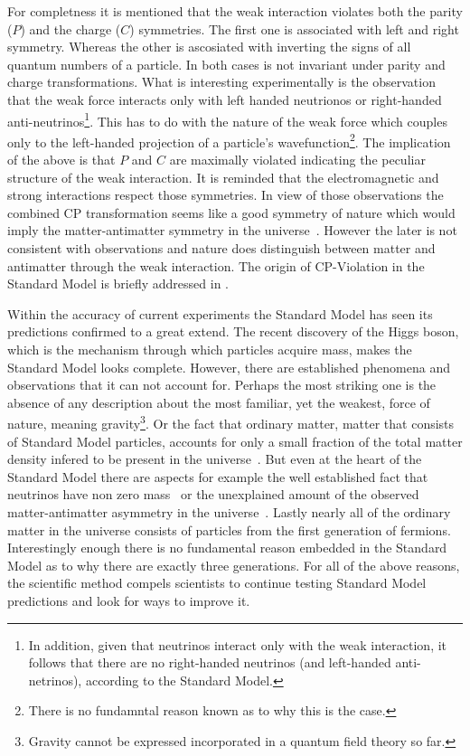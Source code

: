 For completness it is mentioned that the weak interaction violates both the parity ($P$) and the charge ($C$) symmetries.
The first one is associated with left and right symmetry. Whereas the other is ascosiated with inverting the signs of all quantum numbers of a particle.
In both cases  is not invariant under parity and charge transformations. What is interesting experimentally
is the observation~\cite{wu-parity,garwin-parity} that the weak force interacts only with left handed neutrionos or right-handed
anti-neutrinos\footnote{In addition, given that neutrinos interact only with the weak interaction, it follows that there are no
right-handed neutrinos (and left-handed anti-netrinos), according to the Standard Model.}. This has to do with the nature of
the weak force which couples only to the left-handed projection of a particle's
wavefunction\footnote{There is no fundamntal reason known as to why this is the case.}. The implication of the above is that
$P$ and $C$ are maximally violated indicating the peculiar structure of the weak interaction. It is reminded that
the electromagnetic and strong interactions respect those symmetries. In view of those observations the combined CP transformation
seems like a good symmetry of nature which would imply the matter-antimatter symmetry in the universe~\cite{Sakharov:1967dj}.
However the later is not consistent with observations and nature does distinguish between matter and antimatter through
the weak interaction. The origin of CP-Violation in the Standard Model is briefly addressed in .

Within the accuracy of current experiments the Standard Model has seen its predictions confirmed to a great extend.
The recent discovery of the Higgs boson, which is the mechanism through which particles acquire mass, makes the Standard Model looks
complete. However, there are established phenomena and observations that it can not
account for. Perhaps the most striking one is the absence of any description about the most familiar, yet the weakest, force of nature,
meaning gravity\footnote{Gravity cannot be expressed incorporated in a quantum field theory so far.}.
Or the fact that ordinary matter, \ie matter that consists of Standard Model particles, accounts for only a small
fraction of the total matter density infered to be present in the universe~\cite{dmatter-Hinshaw}. But even at the heart
of the Standard Model there are aspects for example the well established fact that neutrinos have non zero
mass~\cite{nu-mass-superkam,nu-mass-kamland,nu-mass-sno,nu-mass-daya} or the unexplained amount of the observed
matter-antimatter asymmetry in the universe~\cite{more-cpv-huet,more-cpv-gavela_I,more-cpv-gavela_II}.
Lastly nearly all of the ordinary matter in the universe consists of
particles from the first generation of fermions. Interestingly enough there is no fundamental reason embedded in the Standard Model
as to why there are exactly three generations. For all of the above reasons, the scientific method compels scientists to continue
testing Standard Model predictions and look for ways to improve it.
